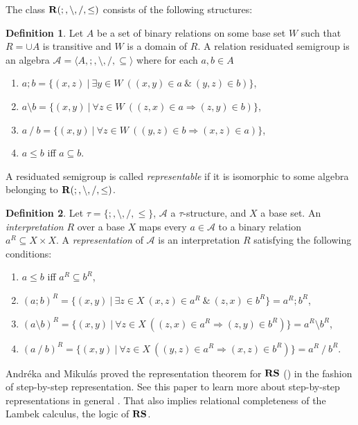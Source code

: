 \documentclass[a4paper]{article}
\theoremstyle{definition}
\newtheorem{definition}{Definition}
\theoremstyle{theorem}
\theoremstyle{proposition}
\theoremstyle{lemma}
\theoremstyle{ex}
\theoremstyle{corollary}
\theoremstyle{claim}
\begin{document}
The class ${\bf R}(;, \setminus, /, \leq)$ consists of the following structures:

\begin{definition} \label{rrs}
  Let $A$ be a set of binary relations on some base set $W$ such that $R = \cup A$ is transitive and $W$ is a domain of $R$. A relation residuated semigroup is an algebra $\mathcal{A} = \langle A, ;, \setminus, /, \subseteq \rangle$ where for each $a, b \in A$
  \begin{enumerate}
    \item $a ; b = \{ (x, z) \: | \: \exists y \in W \: ((x, y) \in a \: \& \: (y, z) \in b) \}$,
    \item $a \setminus b = \{ (x, y) \: | \: \forall z \in W \: ((z, x) \in a \Rightarrow (z, y) \in b)\}$,
    \item $a \: / \: b = \{ (x, y) \: | \: \forall z \in W \: ((y, z) \in b \Rightarrow (x, z) \in a)\}$,
    \item $a \leq b$ iff $a \subseteq b$.
  \end{enumerate}
\end{definition}
A residuated semigroup is called \emph{representable} if it is isomorphic to some algebra belonging to ${\bf R}(;, \setminus, /, \leq)$.

\begin{definition}
  Let $\tau = \{ ;, \setminus, /, \leq \}$, $\mathcal{A}$ a $\tau$-structure, and $X$ a base set. An \emph{interpretation} $R$ over a base $X$ maps every $a \in \mathcal{A}$ to a binary relation $a^R \subseteq X \times X$. A \emph{representation} of $\mathcal{A}$ is an interpretation $R$ satisfying the following conditions:

  \begin{enumerate}
    \item $a \leq b$ iff $a^R \subseteq b^R$,
    \item $(a;b)^R = \{ (x, y) \: | \: \exists z \in X \: (x, z) \in a^R \: \& \: (z, x) \in b^R \} = a^R ; b^R$,
    \item $(a \setminus b)^{R} = \{ (x, y) \: | \: \forall z \in X \: ((z, x) \in a^R \Rightarrow (z, y) \in b^R)\} = a^R \setminus b^R$,
    \item $(a \: / \: b)^{R} = \{ (x, y) \: | \: \forall z \in X \: ((y, z) \in a^R \Rightarrow (x, z) \in b^R)\} = a^R \: / \: b^R$.
  \end{enumerate}
\end{definition}

Andr\'{e}ka and Mikul\'{a}s proved the representation theorem for ${\bf RS}$ (\cite{andreka1994lambek}) in the fashion of step-by-step representation. See this paper to learn more about step-by-step representations in general \cite{hirsch1997step}. That also implies relational completeness of the Lambek calculus, the logic of ${\bf RS}$.
\end{document}
